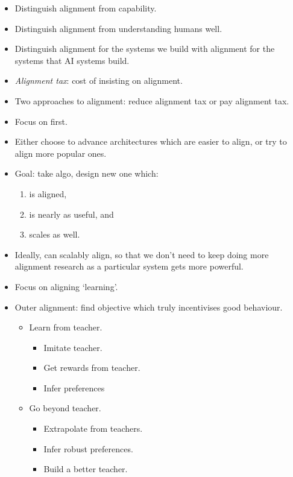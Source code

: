 \begin{itemize}
    \item Distinguish alignment from capability.
    \item Distinguish alignment from understanding humans well.
    \item Distinguish alignment for the systems we build with alignment for the systems that AI systems build.
    \item \emph{Alignment tax}: cost of insisting on alignment.
    \item Two approaches to alignment: reduce alignment tax or pay alignment tax.
    \item Focus on first.
    \item Either choose to advance architectures which are easier to align, or try to align more popular ones.
    \item Goal: take algo, design new one which:
    \begin{enumerate}[label=(\alph*)]
        \item is aligned,
        \item is nearly as useful, and
        \item scales as well.
    \end{enumerate}
    \item Ideally, can scalably align, so that we don't need to keep doing more alignment research as a particular system gets more powerful.
    \item Focus on aligning `learning'.
    \pagebreak
    \item Outer alignment: find objective which truly incentivises good behaviour.
    \begin{itemize}
        \item Learn from teacher.
        \begin{itemize}
            \item Imitate teacher.
            \item Get rewards from teacher.
            \item Infer preferences
        \end{itemize}
        \item Go beyond teacher.
        \begin{itemize}
            \item Extrapolate from teachers.
            \item Infer robust preferences.
            \item Build a better teacher.
        \end{itemize}

\end{itemize}
\end{itemize}
